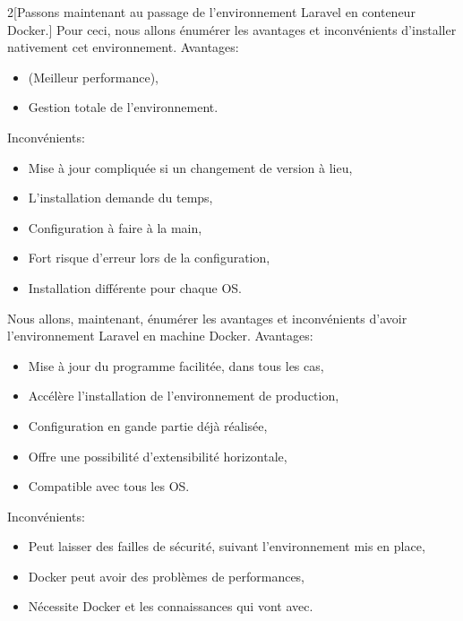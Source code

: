 \documentclass[
    iai, %
    il, %
]{heig-tb}
\begin{document}
\begin{multicols}{2}[Passons maintenant au passage de l'environnement Laravel en conteneur Docker.]
    Pour ceci, nous allons énumérer les avantages et inconvénients d'installer nativement cet environnement.\newline
    Avantages:
    \begin{itemize}
        \item (Meilleur performance),
        \item Gestion totale de l'environnement.
    \end{itemize}

    Inconvénients:
    \begin{itemize}
        \item Mise à jour compliquée si un changement de version à lieu,
        \item L'installation demande du temps,
        \item Configuration à faire à la main,
        \item Fort risque d'erreur lors de la configuration,
        \item Installation différente pour chaque OS.
    \end{itemize}

    \columnbreak
    Nous allons, maintenant, énumérer les avantages et inconvénients d'avoir l'environnement Laravel en machine Docker.\newline
    Avantages:
    \begin{itemize}
        \item Mise à jour du programme facilitée, dans tous les cas,
        \item Accélère l'installation de l'environnement de production,
        \item Configuration en gande partie déjà réalisée,
        \item Offre une possibilité d'extensibilité horizontale,
        \item Compatible avec tous les OS.
    \end{itemize}

    Inconvénients:
    \begin{itemize}
        \item Peut laisser des failles de sécurité, suivant l'environnement mis en place,
        \item Docker peut avoir des problèmes de performances, \cite{labrecque}
        \item Nécessite Docker et les connaissances qui vont avec. \cite{labrecque}
    \end{itemize}
\end{multicols}
\end{document}
